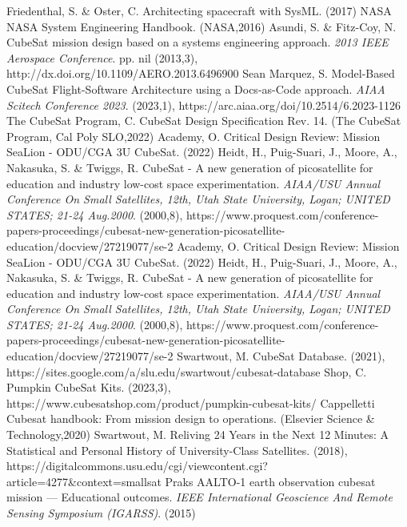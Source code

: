 \begin{thebibliography}{999}
    Friedenthal, S. \& Oster, C. Architecting spacecraft with SysML.  (2017)
    NASA NASA System Engineering Handbook. (NASA,2016)
    Asundi, S. \& Fitz-Coy, N. CubeSat mission design based on a systems engineering approach. {\em 2013 IEEE Aerospace Conference}. pp. nil (2013,3), http://dx.doi.org/10.1109/AERO.2013.6496900
    Sean Marquez, S. Model-Based CubeSat Flight-Software Architecture using a Docs-as-Code approach. {\em AIAA Scitech Conference 2023}. (2023,1), https://arc.aiaa.org/doi/10.2514/6.2023-1126
    The CubeSat Program, C. CubeSat Design Specification Rev. 14. (The CubeSat Program, Cal Poly SLO,2022)
    Academy, O. Critical Design Review: Mission SeaLion - ODU/CGA 3U CubeSat.  (2022)
    Heidt, H., Puig-Suari, J., Moore, A., Nakasuka, S. \& Twiggs, R. CubeSat - A new generation of picosatellite for education and industry low-cost space experimentation. {\em AIAA/USU Annual Conference On Small Satellites, 12th, Utah State University, Logan; UNITED STATES; 21-24 Aug.2000}. (2000,8), https://www.proquest.com/conference-papers-proceedings/cubesat-new-generation-picosatellite-education/docview/27219077/se-2
    Academy, O. Critical Design Review: Mission SeaLion - ODU/CGA 3U CubeSat.  (2022)
    Heidt, H., Puig-Suari, J., Moore, A., Nakasuka, S. \& Twiggs, R. CubeSat - A new generation of picosatellite for education and industry low-cost space experimentation. {\em AIAA/USU Annual Conference On Small Satellites, 12th, Utah State University, Logan; UNITED STATES; 21-24 Aug.2000}. (2000,8), https://www.proquest.com/conference-papers-proceedings/cubesat-new-generation-picosatellite-education/docview/27219077/se-2
    Swartwout, M. CubeSat Database.  (2021), https://sites.google.com/a/slu.edu/swartwout/cubesat-database
    Shop, C. Pumpkin CubeSat Kits.  (2023,3), https://www.cubesatshop.com/product/pumpkin-cubesat-kits/
    Cappelletti Cubesat handbook: From mission design to operations. (Elsevier Science \& Technology,2020)
    Swartwout, M. Reliving 24 Years in the Next 12 Minutes: A Statistical and Personal History of University-Class Satellites.  (2018), https://digitalcommons.usu.edu/cgi/viewcontent.cgi?article=4277\&context=smallsat
    Praks AALTO-1 earth observation cubesat mission — Educational outcomes. {\em IEEE International Geoscience And Remote Sensing Symposium (IGARSS)}. (2015)

\end{thebibliography}
